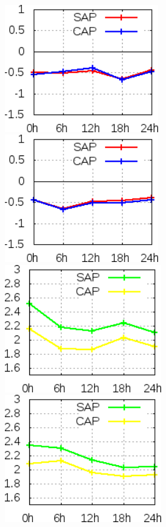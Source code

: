 \begin{figure}[!hbp]
\includegraphics[height=5.5cm]{./figs/VIES850temp0Z.png}\includegraphics[height=5.5cm]{./figs/VIES850temp12Z.png}
\includegraphics[height=5.5cm]{./figs/EQM850temp0Z.png}\includegraphics[height=5.5cm]{./figs/EQM850temp12Z.png}

\end{figure}
